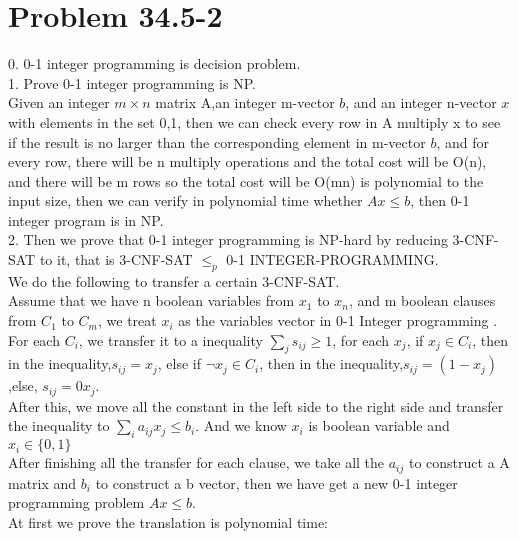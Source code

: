 \documentclass[oneside]{homework} %
\begin{document}
\maketitle
\newpage
\section*{Problem 34.5-2}
0. 0-1 integer programming is decision problem.\\
1. Prove 0-1 integer programming is NP. \\
Given an integer $m\times n$ matrix A,an integer m-vector $b$, and an integer n-vector $x$ with elements in the set {0,1}, then we can check every row in A multiply x to see if the result is no larger than the corresponding element in m-vector $b$, and for every row, there will be n multiply operations and the total cost will be O(n), and there will be m rows so the total cost will be O(mn) is polynomial to the input size, then we can verify in polynomial time whether $Ax\leq b$, then 0-1 integer program is in NP.\\
2. Then we prove that 0-1 integer programming is NP-hard by reducing 3-CNF-SAT to it, that is 3-CNF-SAT $\leq_{p}$ 0-1 INTEGER-PROGRAMMING.\\
We do the following to transfer a certain 3-CNF-SAT.\\ 
Assume that we have n boolean variables from $x_{1}$ to $x_{n}$, and m boolean clauses from $C_{1}$ to $C_{m}$, we treat $x_{i}$ as the variables vector in 0-1 Integer programming . \\For each $C_{i}$, we transfer it to a inequality $\sum_{j}s_{ij} \geq 1$, for each $x_{j}$, if $x_{j} \in C_{i}$, then in the inequality,$s_{ij} = x_{j}$, else if $\neg x_{j} \in C_{i}$, then in the inequality,$s_{ij} = (1-x_{j})$,else, $s_{ij} = 0x_{j}$. 
\\ After this, we move all the constant in the left side to the right side and transfer the inequality to $\sum_{i}a_{ij}x_{j} \leq b_{i}$. And we know $x_{i}$ is boolean variable and $x_{i} \in \{0,1\}$ \\

After finishing all the transfer for each clause, we take all the $a_{ij}$ to construct a A matrix and $b_{i}$ to construct a b vector, then we have get a new 0-1 integer programming problem $Ax \leq b$.\\

At first we prove the translation is polynomial time: \\
\end{document}
